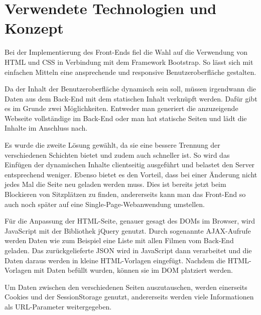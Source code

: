 \section{Verwendete Technologien und Konzept}
\authorsection{\authorNL}
Bei der Implementierung des Front-Ends fiel die Wahl auf die Verwendung von \acs{HTML} und \acs{CSS} in Verbindung mit dem Framework Bootstrap.
So lässt sich mit einfachen Mitteln eine ansprechende und responsive Benutzeroberfläche gestalten.

Da der Inhalt der Benutzeroberfläche dynamisch sein soll, müssen irgendwann die Daten aus dem Back-End mit dem statischen Inhalt verknüpft werden.
Dafür gibt es im Grunde zwei Möglichkeiten.
Entweder man generiert die anzuzeigende Webseite vollständige im Back-End oder man hat statische Seiten und lädt die Inhalte im Anschluss nach.

Es wurde die zweite Lösung gewählt, da sie eine bessere Trennung der verschiedenen Schichten bietet und zudem auch schneller ist.
So wird das Einfügen der dynamischen Inhalte clientseitig ausgeführt und belastet den Server entsprechend weniger.
Ebenso bietet es den Vorteil, dass bei einer Änderung nicht jedes Mal die Seite neu geladen werden muss.
Dies ist bereits jetzt beim Blockieren von Sitzplätzen zu finden, andererseits kann man das Front-End so auch noch später auf eine Single-Page-Webanwendung umstellen.

Für die Anpassung der \acs{HTML}-Seite, genauer gesagt des \acs{DOM}s im Browser, wird Java\-Script mit der Bibliothek jQuery genutzt.
Durch sogenannte \acs{AJAX}-Aufrufe werden Daten wie zum Beispiel eine Liste mit allen Filmen vom Back-End geladen.
Das zurückgelieferte \acs{JSON} wird in JavaScript dann verarbeitet und die Daten daraus werden in kleine \acs{HTML}-Vorlagen eingefügt.
Nachdem die \acs{HTML}-Vorlagen mit Daten befüllt wurden, können sie im \acs{DOM} platziert werden.

Um Daten zwischen den verschiedenen Seiten auszutauschen, werden einerseits Cookies und der SessionStorage genutzt, andererseits werden viele Informationen als \acs{URL}-Parameter weitergegeben.
